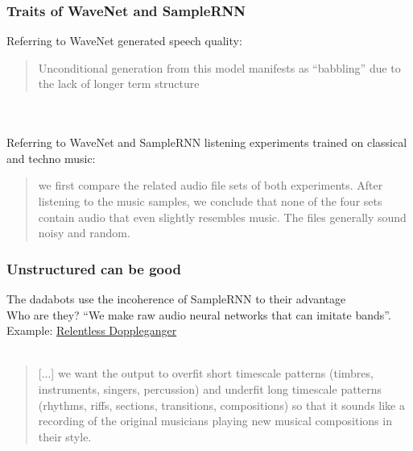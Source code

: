 \documentclass{beamer}
\begin{document}

\begin{frame}
	\frametitle{Traits of WaveNet and SampleRNN}
	Referring to WaveNet generated speech quality:
	\begin{quote}
		Unconditional generation from this model manifests as ``babbling'' due to the lack of longer term structure
	\end{quote}\\\ \\
	Referring to WaveNet and SampleRNN listening experiments trained on classical and techno music:
	\begin{quote}
		we first compare the related audio file sets of both experiments. After listening to the music samples, we conclude that none of the four sets contain audio that even slightly resembles music. The files generally sound noisy and random.
	\end{quote}
\end{frame}


\begin{frame}
	\frametitle{Unstructured can be good}
	The dadabots use the incoherence of SampleRNN to their advantage\\
	Who are they? ``We make raw audio neural networks that can imitate bands''. Example: \href{https://www.youtube.com/watch?v=MwtVkPKx3RA}{Relentless Doppleganger}\\\ \\
	\begin{quote}
		[...] we want the output to overﬁt short timescale patterns (timbres, instruments, singers, percussion) and underﬁt long timescale patterns (rhythms, riffs, sections, transitions, compositions) so that it sounds like a recording of the original musicians playing new musical compositions in their style.
	\end{quote}
\end{frame}
\end{document}
